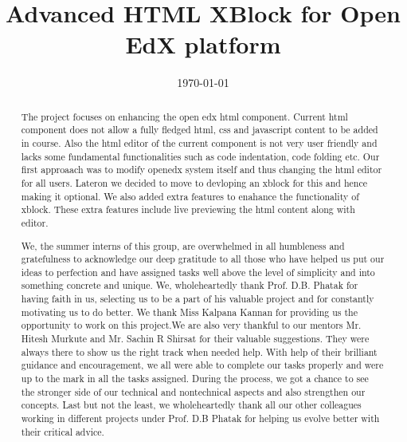 \documentclass[a4paper, twoside, openright]{memoir}
\begin{document}
\pagestyle{plain}
\title{Advanced HTML XBlock for Open EdX platform}
\date{\today}

\frontmatter

\maketitle

\pagebreak

\begin{abstract}
The project focuses on enhancing the open edx html component. Current html component does not
allow a fully fledged html, css and javascript content to be added in course. Also the html editor of
the current component is not very user friendly and lacks some fundamental functionalities such as
code indentation, code folding etc. Our first approaach was to modify openedx system itself and
thus changing the html editor for all users. Lateron we decided to move to devloping an xblock for
this and hence making it optional. We also added extra features to enahance the functionality of
xblock. These extra features include live previewing the html content along with editor.
\end{abstract}

\pagebreak

\renewcommand{\abstractname}{Acknowledgements}
\begin{abstract}
	We, the summer interns of this group, are overwhelmed in all humbleness and
gratefulness to acknowledge our deep gratitude to all those who have helped us put
our ideas to perfection and have assigned tasks well above the level of simplicity and
into something concrete and unique.
We, wholeheartedly thank Prof. D.B. Phatak for having faith in us, selecting us to be
a part of his valuable project and for constantly motivating us to do better.
We thank Miss Kalpana Kannan for providing us the opportunity to work on this
project.We are also very thankful to our mentors Mr. Hitesh Murkute and Mr. Sachin R Shirsat
for their valuable suggestions. They were always there to show us the right track when needed help.
With help of their brilliant guidance and encouragement, we all were able to complete
our tasks properly and were up to the mark in all the tasks assigned. During the
process, we got a chance to see the stronger side of our technical and nontechnical
aspects and also strengthen our concepts.
Last but not the least, we wholeheartedly thank all our other colleagues working in
different projects under Prof. D.B Phatak for helping us evolve better with their critical advice.
\end{abstract}

\pagebreak

\tableofcontents

\mainmatter


\end{document}
